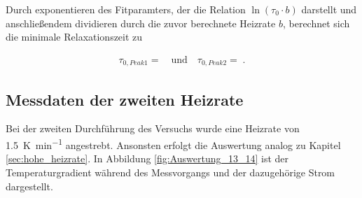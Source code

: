 Durch exponentieren des Fitparamters, der die Relation $\ln(\tau_0\cdot b)$ darstellt und anschließendem dividieren durch die zuvor berechnete Heizrate $b$, berechnet sich die minimale Relaxationszeit zu

\begin{align}
	\tau_{0,Peak1} =   \quad \text{und} \quad \tau_{0,Peak2} = \;.
\end{align}


\subsection{Messdaten der zweiten Heizrate}
Bei der zweiten Durchführung des Versuchs wurde eine Heizrate von \SI{1.5}{\kelvin\per\minute} angestrebt. Ansonsten erfolgt die Auswertung analog zu Kapitel \ref{sec:hohe_heizrate}.
In Abbildung \ref{fig:Auswertung_13_14} ist der Temperaturgradient während des Messvorgangs und der dazugehörige Strom dargestellt. 

